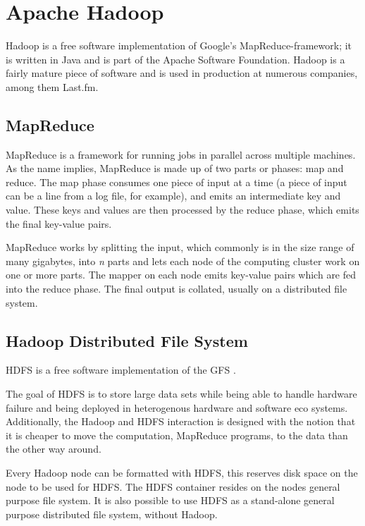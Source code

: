 \section{Apache Hadoop}

Hadoop is a free software implementation of Google's MapReduce-framework; it is
written in Java and is part of the Apache Software Foundation. Hadoop is a
fairly mature piece of software and is used in production at numerous companies,
among them Last.fm.
\cite{hadoop}


\subsection{MapReduce}

MapReduce is a framework for running jobs in parallel across multiple
machines. As the name implies, MapReduce is made up of two parts or
phases: map and reduce. The map phase consumes one piece of input at a
time (a piece of input can be a line from a log file, for example), and
emits an intermediate key and value. These keys and values are then
processed by the reduce phase, which emits the final key-value pairs.

MapReduce works by splitting the input, which commonly is in the size
range of many gigabytes, into \textit{n} parts and lets each node of the
computing cluster work on one or more parts. The mapper on each node emits
key-value pairs which are fed into the reduce phase. The final output is
collated, usually on a distributed file system.


\subsection*{Hadoop Distributed File System}

HDFS is a free software implementation of the GFS \cite{gfs}.

The goal of HDFS is to store large data sets while being able to handle
hardware failure and being deployed in heterogenous hardware and software
eco systems. Additionally, the Hadoop and HDFS interaction is designed with
the notion that it is cheaper to move the computation, MapReduce programs,
to the data than the other way around.

Every Hadoop node can be formatted with HDFS, this reserves disk space on
the node to be used for HDFS. The HDFS container resides on the nodes
general purpose file system. It is also possible to use HDFS as a
stand-alone general purpose distributed file system, without Hadoop.

